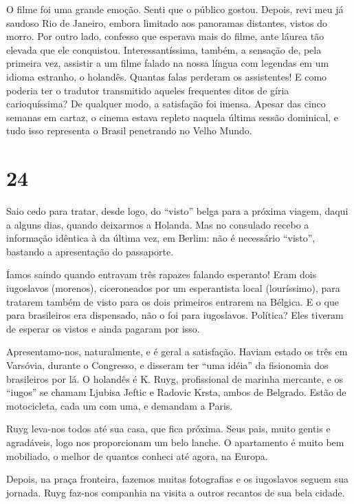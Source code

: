 O filme foi uma grande emoção. Senti que o público gostou. Depois, revi meu já saudoso Rio de Janeiro, embora limitado aos panoramas distantes, vistos do morro. Por outro lado, confesso que esperava mais do filme, ante láurea tão elevada que ele conquistou. Interessantíssima, também, a sensação de, pela primeira vez, assistir a um filme falado na nossa língua com legendas em um idioma estranho, o holandês. Quantas falas perderam os assistentes! E como poderia ter o tradutor transmitido aqueles frequentes ditos de gíria carioquíssima? De qualquer modo, a satisfação foi imensa. Apesar das cinco semanas em cartaz, o cinema estava repleto naquela última sessão dominical, e tudo isso representa o Brasil penetrando no Velho Mundo.

\section*{24 \adfflatleafright {}}
Saio cedo para tratar, desde logo, do ``visto'' belga para a próxima viagem, daqui a alguns dias, quando deixarmos a Holanda. Mas no consulado recebo a informação idêntica à da última vez, em Berlim: não é necessário ``visto'', bastando a apresentação do passaporte.

Íamos saindo quando entravam três rapazes falando esperanto! Eram dois iugoslavos (morenos), ciceroneados por um esperantista local (louríssimo), para tratarem também de visto para os dois primeiros entrarem na Bélgica. E o que para brasileiros era dispensado, não o foi para iugoslavos. Política? Eles tiveram de esperar os vistos e ainda pagaram por isso.

Apresentamo-nos, naturalmente, e é geral a satisfação. Haviam estado os três em Varsóvia, durante o Congresso, e disseram ter ``uma idéia'' da fisionomia dos brasileiros por lá. O holandês é K. Ruyg, profissional de marinha mercante, e os ``iugos'' se chamam Ljubisa Jeftic e Radovic Krsta, ambos de Belgrado. Estão de motocicleta, cada um com uma, e demandam a Paris.

Ruyg leva-nos todos até sua casa, que fica próxima. Seus pais, muito gentis e agradáveis, logo nos proporcionam um belo lanche. O apartamento é muito bem mobiliado, o melhor de quantos conheci até agora, na Europa.

Depois, na praça fronteira, fazemos muitas fotografias e os iugoslavos seguem sua jornada. Ruyg faz-nos companhia na visita a outros recantos de sua bela cidade.

